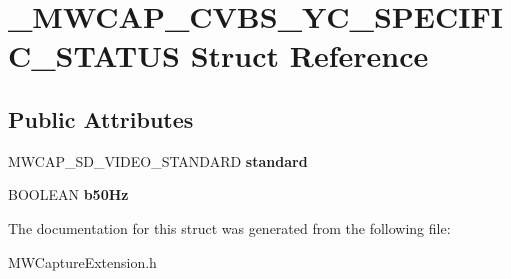 \hypertarget{struct__MWCAP__CVBS__YC__SPECIFIC__STATUS}{\section{\-\_\-\-M\-W\-C\-A\-P\-\_\-\-C\-V\-B\-S\-\_\-\-Y\-C\-\_\-\-S\-P\-E\-C\-I\-F\-I\-C\-\_\-\-S\-T\-A\-T\-U\-S Struct Reference}
\label{struct__MWCAP__CVBS__YC__SPECIFIC__STATUS}
}
\subsection*{Public Attributes}
\begin{DoxyCompactItemize}
\item 
\hypertarget{struct__MWCAP__CVBS__YC__SPECIFIC__STATUS_a2fe5edce5d8d68a3b60a4c98a7438982}{M\-W\-C\-A\-P\-\_\-\-S\-D\-\_\-\-V\-I\-D\-E\-O\-\_\-\-S\-T\-A\-N\-D\-A\-R\-D {\bfseries standard}}\label{struct__MWCAP__CVBS__YC__SPECIFIC__STATUS_a2fe5edce5d8d68a3b60a4c98a7438982}

\item 
\hypertarget{struct__MWCAP__CVBS__YC__SPECIFIC__STATUS_a0a63a7a179f6a178edfcf1d412514f78}{B\-O\-O\-L\-E\-A\-N {\bfseries b50\-Hz}}\label{struct__MWCAP__CVBS__YC__SPECIFIC__STATUS_a0a63a7a179f6a178edfcf1d412514f78}

\end{DoxyCompactItemize}


The documentation for this struct was generated from the following file\-:\begin{DoxyCompactItemize}
\item 
M\-W\-Capture\-Extension.\-h\end{DoxyCompactItemize}
